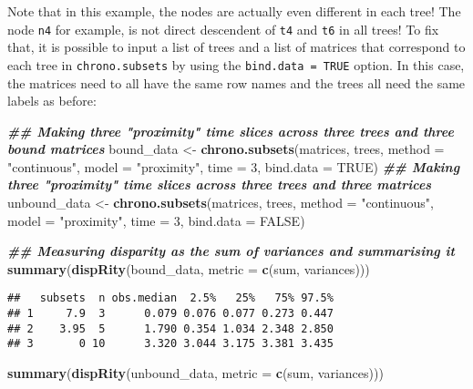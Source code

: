 \documentclass[
]{book}
\newenvironment{Shaded}{\begin{snugshade}}{\end{snugshade}}
\newcommand{\AttributeTok}[1]{\textcolor[rgb]{0.13,0.29,0.53}{#1}}
\newcommand{\ConstantTok}[1]{\textcolor[rgb]{0.56,0.35,0.01}{#1}}
\newcommand{\DecValTok}[1]{\textcolor[rgb]{0.00,0.00,0.81}{#1}}
\newcommand{\DocumentationTok}[1]{\textcolor[rgb]{0.56,0.35,0.01}{\textbf{\textit{#1}}}}
\newcommand{\FunctionTok}[1]{\textcolor[rgb]{0.13,0.29,0.53}{\textbf{#1}}}
\newcommand{\NormalTok}[1]{#1}
\newcommand{\OtherTok}[1]{\textcolor[rgb]{0.56,0.35,0.01}{#1}}
\newcommand{\StringTok}[1]{\textcolor[rgb]{0.31,0.60,0.02}{#1}}
\begin{document}
Note that in this example, the nodes are actually even different in each tree! The node \texttt{n4} for example, is not direct descendent of \texttt{t4} and \texttt{t6} in all trees!
To fix that, it is possible to input a list of trees and a list of matrices that correspond to each tree in \texttt{chrono.subsets} by using the \texttt{bind.data\ =\ TRUE} option.
In this case, the matrices need to all have the same row names and the trees all need the same labels as before:

\begin{Shaded}
\begin{Highlighting}[]
\DocumentationTok{\#\# Making three "proximity" time slices across three trees and three bound matrices}
\NormalTok{bound\_data }\OtherTok{\textless{}{-}} \FunctionTok{chrono.subsets}\NormalTok{(matrices, trees,}
                             \AttributeTok{method =} \StringTok{"continuous"}\NormalTok{,}
                             \AttributeTok{model =} \StringTok{"proximity"}\NormalTok{,}
                             \AttributeTok{time =} \DecValTok{3}\NormalTok{,}
                             \AttributeTok{bind.data =} \ConstantTok{TRUE}\NormalTok{)}
\DocumentationTok{\#\# Making three "proximity" time slices across three trees and three matrices}
\NormalTok{unbound\_data }\OtherTok{\textless{}{-}} \FunctionTok{chrono.subsets}\NormalTok{(matrices, trees,}
                               \AttributeTok{method =} \StringTok{"continuous"}\NormalTok{,}
                               \AttributeTok{model =} \StringTok{"proximity"}\NormalTok{,}
                               \AttributeTok{time =} \DecValTok{3}\NormalTok{,}
                               \AttributeTok{bind.data =} \ConstantTok{FALSE}\NormalTok{)}

\DocumentationTok{\#\# Measuring disparity as the sum of variances and summarising it}
\FunctionTok{summary}\NormalTok{(}\FunctionTok{dispRity}\NormalTok{(bound\_data, }\AttributeTok{metric =} \FunctionTok{c}\NormalTok{(sum, variances)))}
\end{Highlighting}
\end{Shaded}

\begin{verbatim}
##   subsets  n obs.median  2.5%   25%   75% 97.5%
## 1     7.9  3      0.079 0.076 0.077 0.273 0.447
## 2    3.95  5      1.790 0.354 1.034 2.348 2.850
## 3       0 10      3.320 3.044 3.175 3.381 3.435
\end{verbatim}

\begin{Shaded}
\begin{Highlighting}[]
\FunctionTok{summary}\NormalTok{(}\FunctionTok{dispRity}\NormalTok{(unbound\_data, }\AttributeTok{metric =} \FunctionTok{c}\NormalTok{(sum, variances)))}
\end{Highlighting}
\end{Shaded}
\end{document}
